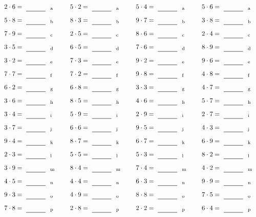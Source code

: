 \documentclass
[
  draft    = true,
  fontsize = 11pt,
  parskip  = half-
]
{scrartcl}
\begin{document}
\par\vfill\par
\begin{align*}
    \pline{2\cdot6}&=\rline{a}
  & \pline{5\cdot2}&=\rline{a}
  & \pline{5\cdot4}&=\rline{a}
  & \pline{5\cdot6}&=\rline{a} \\[1ex]
    \pline{5\cdot8}&=\rline{b}
  & \pline{8\cdot3}&=\rline{b}
  & \pline{9\cdot7}&=\rline{b}
  & \pline{3\cdot8}&=\rline{b} \\[1ex]
    \pline{7\cdot9}&=\rline{c}
  & \pline{2\cdot5}&=\rline{c}
  & \pline{8\cdot6}&=\rline{c}
  & \pline{2\cdot4}&=\rline{c} \\[1ex]
    \pline{3\cdot5}&=\rline{d}
  & \pline{6\cdot5}&=\rline{d}
  & \pline{7\cdot6}&=\rline{d}
  & \pline{8\cdot9}&=\rline{d} \\[1ex]
    \pline{3\cdot2}&=\rline{e}
  & \pline{7\cdot3}&=\rline{e}
  & \pline{9\cdot2}&=\rline{e}
  & \pline{9\cdot6}&=\rline{e} \\[1ex]
    \pline{7\cdot7}&=\rline{f}
  & \pline{7\cdot2}&=\rline{f}
  & \pline{9\cdot8}&=\rline{f}
  & \pline{4\cdot8}&=\rline{f} \\[1ex]
    \pline{6\cdot2}&=\rline{g}
  & \pline{6\cdot8}&=\rline{g}
  & \pline{3\cdot3}&=\rline{g}
  & \pline{4\cdot7}&=\rline{g} \\[1ex]
    \pline{3\cdot6}&=\rline{h}
  & \pline{8\cdot5}&=\rline{h}
  & \pline{4\cdot6}&=\rline{h}
  & \pline{5\cdot7}&=\rline{h} \\[1ex]
    \pline{3\cdot4}&=\rline{i}
  & \pline{5\cdot9}&=\rline{i}
  & \pline{2\cdot9}&=\rline{i}
  & \pline{2\cdot7}&=\rline{i} \\[1ex]
    \pline{3\cdot7}&=\rline{j}
  & \pline{6\cdot6}&=\rline{j}
  & \pline{9\cdot5}&=\rline{j}
  & \pline{4\cdot3}&=\rline{j} \\[1ex]
    \pline{9\cdot4}&=\rline{k}
  & \pline{8\cdot7}&=\rline{k}
  & \pline{6\cdot7}&=\rline{k}
  & \pline{6\cdot9}&=\rline{k} \\[1ex]
    \pline{2\cdot3}&=\rline{l}
  & \pline{5\cdot5}&=\rline{l}
  & \pline{5\cdot3}&=\rline{l}
  & \pline{8\cdot2}&=\rline{l} \\[1ex]
    \pline{3\cdot9}&=\rline{m}
  & \pline{8\cdot4}&=\rline{m}
  & \pline{7\cdot4}&=\rline{m}
  & \pline{4\cdot2}&=\rline{m} \\[1ex]
    \pline{4\cdot5}&=\rline{n}
  & \pline{4\cdot4}&=\rline{n}
  & \pline{6\cdot3}&=\rline{n}
  & \pline{9\cdot9}&=\rline{n} \\[1ex]
    \pline{9\cdot3}&=\rline{o}
  & \pline{4\cdot9}&=\rline{o}
  & \pline{8\cdot8}&=\rline{o}
  & \pline{7\cdot5}&=\rline{o} \\[1ex]
    \pline{7\cdot8}&=\rline{p}
  & \pline{2\cdot8}&=\rline{p}
  & \pline{2\cdot2}&=\rline{p}
  & \pline{6\cdot4}&=\rline{p}
\end{align*}
\end{document}
